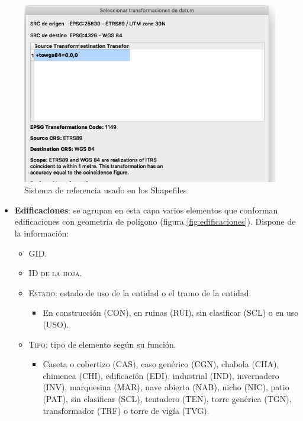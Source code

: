 \begin{enumerate}
	

	\begin{figure}[H]
		\centering
		\includegraphics[width=0.56\linewidth]{imagenes/capitulo5/codificacion}
		\caption{Sistema de referencia usado en los Shapefiles}
		\label{fig:codificacion}
	\end{figure}

	\begin{itemize}
		\item \textbf{Edificaciones}: se agrupan en esta capa varios elementos que conforman edificaciones con geometría de polígono (figura \ref{fig:edificaciones}). Dispone de la información:
		
		\begin{itemize}
			\item \textsc{GID}.	
			\item \textsc{ID de la hoja}.
			\item \textsc{Estado}: estado de uso de la entidad o el tramo de la entidad.
			\begin{itemize}
				\item 	\small{En construcción (CON), en ruinas (RUI), sin clasificar (SCL) o en uso (USO).}
			\end{itemize}
			
			\item \textsc{Tipo}: tipo de elemento según su función.
			\begin{itemize}
				\item 	\small{Caseta o cobertizo (CAS), caso genérico (CGN), chabola (CHA), chimenea (CHI), edificación (EDI), industrial (IND), invernadero (INV), marquesina (MAR), nave abierta (NAB), nicho (NIC), patio (PAT), sin clasificar (SCL), tentadero (TEN), torre genérica (TGN), transformador (TRF) o torre de vigía (TVG).}
			\end{itemize}
			 
		\end{itemize}
	

\end{itemize}
\end{enumerate}
